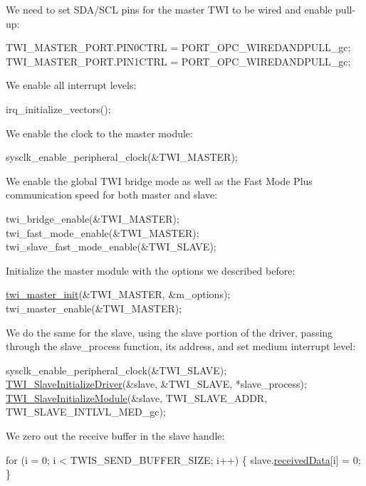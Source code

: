 We need to set S\-D\-A/\-S\-C\-L pins for the master T\-W\-I to be wired and enable pull-\/up\-: 
\begin{DoxyCode}
        TWI\_MASTER\_PORT.PIN0CTRL = PORT\_OPC\_WIREDANDPULL\_gc;
        TWI\_MASTER\_PORT.PIN1CTRL = PORT\_OPC\_WIREDANDPULL\_gc;
\end{DoxyCode}


We enable all interrupt levels\-: 
\begin{DoxyCode}
        irq\_initialize\_vectors();
\end{DoxyCode}


We enable the clock to the master module\-: 
\begin{DoxyCode}
        sysclk\_enable\_peripheral\_clock(&TWI\_MASTER);
\end{DoxyCode}


We enable the global T\-W\-I bridge mode as well as the Fast Mode Plus communication speed for both master and slave\-: 
\begin{DoxyCode}
        twi\_bridge\_enable(&TWI\_MASTER);
        twi\_fast\_mode\_enable(&TWI\_MASTER);
        twi\_slave\_fast\_mode\_enable(&TWI\_SLAVE);
\end{DoxyCode}


Initialize the master module with the options we described before\-: 
\begin{DoxyCode}
        \hyperlink{group__group__xmega__drivers__twi__twim_ga8029a07f3322bf43c289f5acb442ef29}{twi\_master\_init}(&TWI\_MASTER, &m\_options);
        twi\_master\_enable(&TWI\_MASTER);
\end{DoxyCode}


We do the same for the slave, using the slave portion of the driver, passing through the slave\-\_\-process function, its address, and set medium interrupt level\-: 
\begin{DoxyCode}
        sysclk\_enable\_peripheral\_clock(&TWI\_SLAVE);
        \hyperlink{group__group__xmega__drivers__twi__twis_ga14b9327d32373a2481e23bec041cbd7e}{TWI\_SlaveInitializeDriver}(&slave, &TWI\_SLAVE, 
      *slave\_process);
        \hyperlink{group__group__xmega__drivers__twi__twis_ga7516e604cb0aacddd8d1016a54039752}{TWI\_SlaveInitializeModule}(&slave, 
      TWI\_SLAVE\_ADDR,
                TWI\_SLAVE\_INTLVL\_MED\_gc);
\end{DoxyCode}


We zero out the receive buffer in the slave handle\-: 
\begin{DoxyCode}
        \textcolor{keywordflow}{for} (i = 0; i < TWIS\_SEND\_BUFFER\_SIZE; i++) \{
            slave.\hyperlink{struct_t_w_i___slave_a8c205728fdea8bcaeaa0f6f889d83d4d}{receivedData}[i] = 0;
        \}
\end{DoxyCode}


